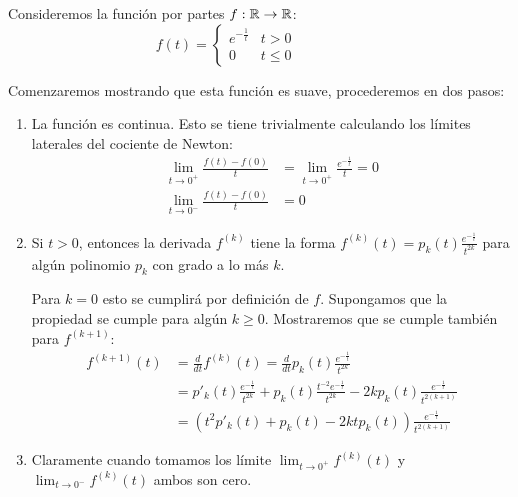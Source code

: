 \begin{example}\label{Ex: Función Indicadora}
	Consideremos la función por partes $f: \mathbb{R} \to \mathbb{R}$:
	\[ f(t) =
		\begin{cases}
			e^{-\frac{1}{t}} & t > 0    \\
			0                & t \leq 0
		\end{cases}
		\qquad \qquad
		\begin{gathered}
			
		\end{gathered}
	\]

	Comenzaremos mostrando que esta función es suave, procederemos en dos pasos:

	\begin{enumerate}
		\item La función es continua. Esto se tiene trivialmente calculando los límites laterales del cociente de Newton:
		      \begin{align*}
			      \lim_{t \to 0^+} \frac{f(t) - f(0)}{t} & = \lim_{t \to 0^+} \frac{e^{-\frac{1}{t}}}{t} = 0 \\
			      \lim_{t \to 0^-} \frac{f(t) - f(0)}{t} & = 0
		      \end{align*}
		\item Si $t > 0$, entonces la derivada $f^{(k)}$ tiene la forma $f^{(k)}(t) = p_k(t)\frac{e^{-\frac{1}{t}}}{t^{2k}}$ para algún polinomio $p_k$ con grado a lo más $k$.

		      Para $k = 0$ esto se cumplirá por definición de $f$. Supongamos que la propiedad se cumple para algún $k \geq 0$. Mostraremos que se cumple también para $f^{(k+1)}$:
		      \begin{align*}
			      f^{(k+1)}(t) & = \frac{d}{dt} f^{(k)}(t) = \frac{d}{dt} p_k(t) \frac{e^{-\frac{1}{t}}}{t^{2k}}                                                          \\
			                   & = p'_k(t) \frac{e^{-\frac{1}{t}}}{t^{2k}} + p_k(t) \frac{t^{-2} e^{-\frac{1}{t}}}{t^{2k}} - 2kp_k(t) \frac{e^{-\frac{1}{t}}}{t^{2(k+1)}} \\
			                   & = \left(t^2p'_k(t) + p_k(t) - 2ktp_k(t) \right) \frac{e^{-\frac{1}{t}}}{t^{2(k+1)}}
		      \end{align*}

		\item Claramente cuando tomamos los límite $\lim_{t \to 0^+} f^{(k)}(t)$ y $\lim_{t \to 0^-} f^{(k)}(t)$ ambos son cero.
	\end{enumerate}


\end{example}
